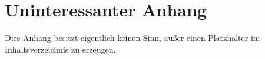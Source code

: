 \chapter{Uninteressanter Anhang}
Dies Anhang besitzt eigentlich keinen Sinn, außer einen Platzhalter im Inhaltsverzeichnis zu erzeugen.